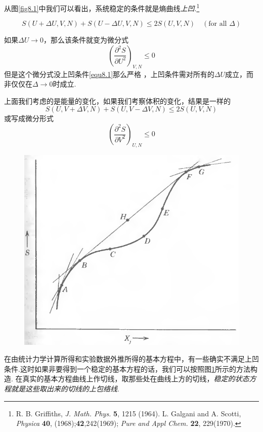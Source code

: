 从图\ref{fig8.1}中我们可以看出，系统稳定的条件就是熵曲线{\it 上凹}.\footnote{R. B. Griffiths, \textit{J. Math. Phys.} \textbf{5}, 1215 (1964). L. Galgani and A. Scotti, \textit{Physica} \textbf{40}, (1968);\textbf{42},242(1969); \textit{Pure and Appl Chem.} \textbf{22}, 229(1970).}

\begin{equation}
\label{equ8.1}
S(U+\Delta　U,V,N)+S(U-\Delta U,V,N)\leq 2S(U,V,N) \quad(\text{for all }\Delta)
\end{equation}

如果$\Delta U\to 0$，那么该条件就变为微分式
\begin{equation}
\label{equ8.2}
\left(\frac{\partial^2S}{\partial U^2}\right)_{V,N}\leq 0
\end{equation}
但是这个微分式没上凹条件\eqref{equ8.1}那么严格
，上凹条件需对所有的$\Delta U$成立，而非仅仅在$\Delta\to 0$时成立.

上面我们考虑的是能量的变化，如果我们考察体积的变化，结果是一样的
\begin{equation}
\label{equ8.3}
S(U,V+\Delta　V,N)+S(U,V-\Delta V,N)\leq 2S(U,V,N)
\end{equation}
或写成微分形式
\begin{equation}
\label{equ8.4}
\left(\frac{\partial^2S}{\partial V^2}\right)_{U,N}\leq 0
\end{equation}

\begin{figure}
\centering
\includegraphics[width=.8\textwidth]{Pictures/fig8.2.png}
\figcaption{}
\label{fig8.2}
\end{figure}

在由统计力学计算所得和实验数据外推所得的基本方程中，有一些确实不满足上凹条件.这时如果非要得到一个稳定的基本方程的话，我们可以按照图\ref{fig8.2}所示的方法构造. 在真实的基本方程曲线上作切线，取那些处在曲线上方的切线，{\it 稳定的状态方程就是这些取出来的切线的上包络线}.

